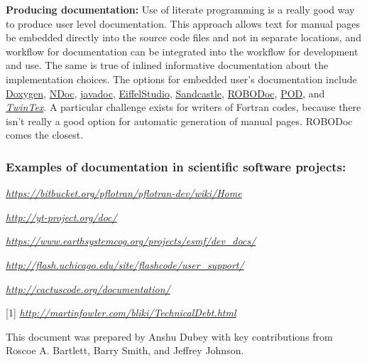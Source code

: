 \documentclass[]{article}
\begin{document}
\textbf{Producing documentation:} Use of
literate programming is a really good way to produce user level
documentation. This approach allows text for manual pages be embedded
directly into the source code files and not in separate locations, and
workflow for documentation can be integrated into the workflow for
development and use. The same is true of inlined informative
documentation about the implementation choices. The options for embedded
user's documentation include
\href{https://en.wikipedia.org/wiki/Doxygen}{Doxygen},
\href{https://en.wikipedia.org/wiki/NDoc}{NDoc},
\href{https://en.wikipedia.org/wiki/Javadoc}{javadoc},
\href{https://en.wikipedia.org/wiki/EiffelStudio}{EiffelStudio},
\href{https://en.wikipedia.org/wiki/Sandcastle_(software)}{Sandcastle},
\href{https://en.wikipedia.org/wiki/ROBODoc}{ROBODoc},
\href{https://en.wikipedia.org/wiki/Plain_Old_Documentation}{POD}, and
\href{https://en.wikipedia.org/wiki/TwinText}{\emph{TwinTex}}. A
particular challenge exists for writers of Fortran codes, because there
isn't really a good option for automatic generation of manual pages.
ROBODoc comes the closest.

\subsubsection{\texorpdfstring{\textbf{Examples of documentation in
scientific software
projects:}}{Examples of documentation in scientific software projects:}}\label{examples-of-documentation-in-scientific-software-projects}

\href{https://bitbucket.org/pflotran/pflotran-dev/wiki/Home}{\emph{https://bitbucket.org/pflotran/pflotran-dev/wiki/Home}}

\href{http://yt-project.org/doc/}{\emph{http://yt-project.org/doc/}}

\href{https://www.earthsystemcog.org/projects/esmf/dev_docs/}{\emph{https://www.earthsystemcog.org/projects/esmf/dev\_docs/}}

\href{http://flash.uchicago.edu/site/flashcode/user_support/}{\emph{http://flash.uchicago.edu/site/flashcode/user\_support/}}

\href{http://cactuscode.org/documentation/}{\emph{http://cactuscode.org/documentation/}}

{[}1{]}
\href{http://martinfowler.com/bliki/TechnicalDebt.html}{\emph{http://martinfowler.com/bliki/TechnicalDebt.html}}

This document was prepared by Anshu Dubey with key contributions from
Roscoe A. Bartlett, Barry Smith, and Jeffrey Johnson.
\end{document}
